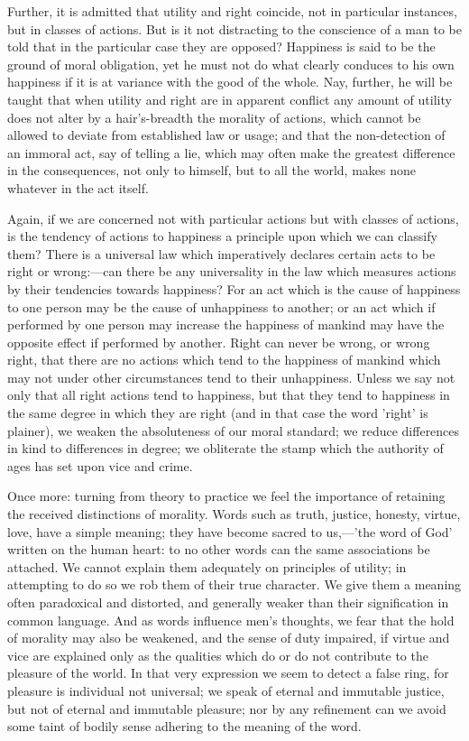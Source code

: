 \documentclass[11pt,letter]{article}
\begin{document}
\par  Further, it is admitted that utility and right coincide, not in particular instances, but in classes of actions. But is it not distracting to the conscience of a man to be told that in the particular case they are opposed? Happiness is said to be the ground of moral obligation, yet he must not do what clearly conduces to his own happiness if it is at variance with the good of the whole. Nay, further, he will be taught that when utility and right are in apparent conflict any amount of utility does not alter by a hair's-breadth the morality of actions, which cannot be allowed to deviate from established law or usage; and that the non-detection of an immoral act, say of telling a lie, which may often make the greatest difference in the consequences, not only to himself, but to all the world, makes none whatever in the act itself.

\par  Again, if we are concerned not with particular actions but with classes of actions, is the tendency of actions to happiness a principle upon which we can classify them? There is a universal law which imperatively declares certain acts to be right or wrong:—can there be any universality in the law which measures actions by their tendencies towards happiness? For an act which is the cause of happiness to one person may be the cause of unhappiness to another; or an act which if performed by one person may increase the happiness of mankind may have the opposite effect if performed by another. Right can never be wrong, or wrong right, that there are no actions which tend to the happiness of mankind which may not under other circumstances tend to their unhappiness. Unless we say not only that all right actions tend to happiness, but that they tend to happiness in the same degree in which they are right (and in that case the word 'right' is plainer), we weaken the absoluteness of our moral standard; we reduce differences in kind to differences in degree; we obliterate the stamp which the authority of ages has set upon vice and crime.

\par  Once more: turning from theory to practice we feel the importance of retaining the received distinctions of morality. Words such as truth, justice, honesty, virtue, love, have a simple meaning; they have become sacred to us,—'the word of God' written on the human heart: to no other words can the same associations be attached. We cannot explain them adequately on principles of utility; in attempting to do so we rob them of their true character. We give them a meaning often paradoxical and distorted, and generally weaker than their signification in common language. And as words influence men's thoughts, we fear that the hold of morality may also be weakened, and the sense of duty impaired, if virtue and vice are explained only as the qualities which do or do not contribute to the pleasure of the world. In that very expression we seem to detect a false ring, for pleasure is individual not universal; we speak of eternal and immutable justice, but not of eternal and immutable pleasure; nor by any refinement can we avoid some taint of bodily sense adhering to the meaning of the word.
\end{document}
